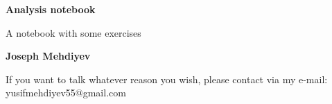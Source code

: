 \begin{titlepage}
    \begin{center}
        \vspace*{1cm}
        \Huge
        \textbf{Analysis notebook}
        
        \vspace*{0.5cm}
        \LARGE
        A notebook with some exercises
        \vspace*{1.5cm}

        \textbf{Joseph Mehdiyev}

        \vfill
        
        \small
        If you want to talk  whatever reason you wish, please contact via my e-mail: yusifmehdiyev55@gmail.com
    \end{center}
\end{titlepage}

